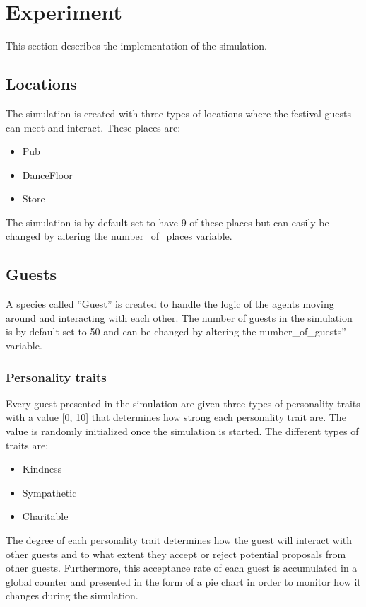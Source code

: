 \documentclass[a4paper,10pt]{article}
\begin{document}
\clearpage
\maketitle

\section{Experiment}
This section describes the implementation of the simulation.

\maketitle
\subsection{Locations}
The simulation is created with three types of locations where the festival guests can meet and interact. These places are:

\begin{itemize}
    \item Pub
    \item DanceFloor
    \item Store
    
\end{itemize}

The simulation is by default set to have 9 of these places but can easily be changed by altering the number\_of\_places variable. 

\subsection{Guests}
A species called ”Guest” is created to handle the logic of the agents moving around and interacting with each other. The number of guests in the simulation is by default set to 50 and can be changed by altering the number\_of\_guests” variable. 

\subsubsection{Personality traits}
Every guest presented in the simulation are given three types of personality traits with a value [0, 10] that determines how strong each personality trait are. The value is randomly initialized once the simulation is started. The different types of traits are:

\begin{itemize}
    \item Kindness
    \item Sympathetic
    \item Charitable
    
\end{itemize}
The degree of each personality trait determines how the guest will interact with other guests and to what extent they accept or reject potential proposals from other guests. Furthermore, this acceptance rate of each guest is accumulated in a global counter and presented in the form of a pie chart in order to monitor how it changes during the simulation. 
\end{document}
